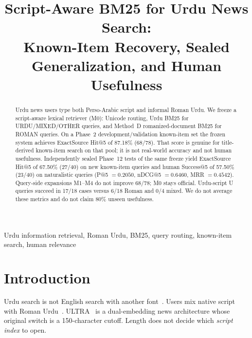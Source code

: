 \documentclass[conference]{IEEEtran}
\begin{document}
\title{Script-Aware BM25 for Urdu News Search:\\
Known-Item Recovery, Sealed Generalization, and Human Usefulness}

\author{
\and
{}
}

\maketitle

\begin{abstract}
Urdu news users type both Perso-Arabic script and informal Roman Urdu. We freeze a script-aware lexical retriever (M0): Unicode routing, Urdu BM25 for URDU/MIXED/OTHER queries, and Method~D romanized-document BM25 for ROMAN queries. On a Phase~2 development/validation known-item set the frozen system achieves ExactSource Hit@5 of 87.18\% (68/78). That score is genuine for title-derived known-item search on that pool; it is not real-world accuracy and not human usefulness. Independently sealed Phase~12 tests of the same freeze yield ExactSource Hit@5 of 67.50\% (27/40) on new known-item queries and human Success@5 of 57.50\% (23/40) on naturalistic queries (P@5 $=0.2050$, nDCG@5 $=0.6460$, MRR $=0.4542$). Query-side expansions M1--M4 do not improve 68/78; M0 stays official. Urdu-script U queries succeed in 17/18 cases versus 6/18 Roman and 0/4 mixed. We do not average these metrics and do not claim 80\% unseen usefulness.
\end{abstract}

\begin{IEEEkeywords}
Urdu information retrieval, Roman Urdu, BM25, query routing, known-item search, human relevance
\end{IEEEkeywords}

\section{Introduction}

Urdu search is not English search with another font~\cite{daud2017urdu}. Users mix native script with Roman Urdu~\cite{hussain2025qlora,mehmood2020xtreme,sitaram2019codeswitch}. ULTRA~\cite{bashir2026ultra} is a dual-embedding news architecture whose original switch is a 150-character cutoff. Length does not decide which \emph{script index} to open.
\end{document}
